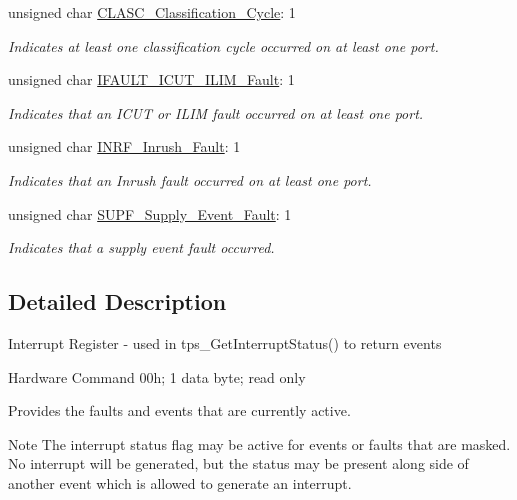 \begin{DoxyCompactItemize}
unsigned char \hyperlink{struct_t_p_s238_x___interrupt___register__t_a17ba691abbe4fda85cf405a0bb8af962}{C\-L\-A\-S\-C\-\_\-\-Classification\-\_\-\-Cycle}\-: 1
\begin{DoxyCompactList}\small\item\em Indicates at least one classification cycle occurred on at least one port. \end{DoxyCompactList}\item 
unsigned char \hyperlink{struct_t_p_s238_x___interrupt___register__t_a98089a33f7d51df0d5ddfc66a14db4a9}{I\-F\-A\-U\-L\-T\-\_\-\-I\-C\-U\-T\-\_\-\-I\-L\-I\-M\-\_\-\-Fault}\-: 1
\begin{DoxyCompactList}\small\item\em Indicates that an I\-C\-U\-T or I\-L\-I\-M fault occurred on at least one port. \end{DoxyCompactList}\item 
unsigned char \hyperlink{struct_t_p_s238_x___interrupt___register__t_a59a57f6f8ac9084ac4a1787791bab499}{I\-N\-R\-F\-\_\-\-Inrush\-\_\-\-Fault}\-: 1
\begin{DoxyCompactList}\small\item\em Indicates that an Inrush fault occurred on at least one port. \end{DoxyCompactList}\item 
unsigned char \hyperlink{struct_t_p_s238_x___interrupt___register__t_aa574718bff2df2bd05f6a8922eb10f38}{S\-U\-P\-F\-\_\-\-Supply\-\_\-\-Event\-\_\-\-Fault}\-: 1
\begin{DoxyCompactList}\small\item\em Indicates that a supply event fault occurred. \end{DoxyCompactList}\end{DoxyCompactItemize}


\subsection{Detailed Description}
Interrupt Register -\/ used in tps\-\_\-\-Get\-Interrupt\-Status() to return events \par
 Hardware Command 00h; 1 data byte; read only \par
\par
 Provides the faults and events that are currently active. \begin{DoxyNote}{Note}
The interrupt status flag may be active for events or faults that are masked. No interrupt will be generated, but the status may be present along side of another event which is allowed to generate an interrupt. 
\end{DoxyNote}


